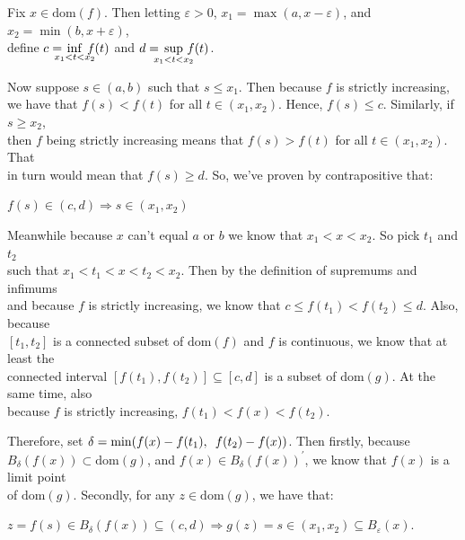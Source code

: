 \documentclass{book}
\newcommand{\pracTwo}{
   \color{Orange}%
   \fontsize{12}{14}\selectfont%
}
\newenvironment{myIndent}{%
   \begin{adjustwidth}{2.5em}{0em}%
}{%
   \end{adjustwidth}%
}
\newcommand{\myHS}{ \hspace{0.5em}}
\newcommand{\domain}[1]{\mathrm{dom}(#1)}
\newcommand{\retTwo}{\hfill\bigbreak}
\begin{document}
{\begin{myIndent} \pracTwo
   Fix $x \in \domain{f}$. Then letting $\varepsilon > 0$, $x_1 = \max(a, x-\varepsilon)$, and $x_2 = \min(b, x+\varepsilon)$,\\ define $c = \hspace{-0.9em}\inf\limits_{x_1 < t < x_2}\hspace{-0.8em}f(t)$ and $d = \hspace{-0.7em}\sup\limits_{x_1 < t < x_2}\hspace{-0.7em}f(t)$.\retTwo

   Now suppose $s \in (a, b)$ such that $s \leq x_1$. Then because $f$ is strictly increasing,\\ we have that $f(s) < f(t)$ for all $t \in (x_1, x_2)$. Hence, $f(s) \leq c$. Similarly, if $s \geq x_2$,\\ then $f$ being strictly increasing means that $f(s) > f(t)$ for all $t \in (x_1, x_2)$. That\\ in turn would mean that $f(s) \geq d$. So, we've proven by contrapositive that:

   {\centering $f(s) \in (c, d) \Longrightarrow s \in (x_1, x_2)$\retTwo\par}

   Meanwhile because $x$ can't equal $a$ or $b$ we know that $x_1 < x < x_2$. So pick $t_1$ and $t_2$\\ such that $x_1 < t_1 < x < t_2 < x_2$. Then by the definition of supremums and infimums\\ and because $f$ is strictly increasing, we know that $c \leq f(t_1) < f(t_2) \leq d$. Also, because\\ $[t_1, t_2]$ is a connected subset of $\domain{f}$ and $f$ is continuous, we know that at least the\\ connected interval $[f(t_1), f(t_2)] \subseteq [c, d]$ is a subset of $\domain{g}$. At the same time, also\\ because $f$ is strictly increasing, $f(t_1) < f(x) < f(t_2)$.\retTwo

   Therefore, set $\delta = \min(f(x) - f(t_1), \myHS f(t_2) - f(x))$. Then firstly, because\\ $B_\delta(f(x)) \subset \domain{g}$, and $f(x) \in B_\delta(f(x))^\prime$, we know that $f(x)$ is a limit point\\ of $\domain{g}$. Secondly, for any $z \in \domain{g}$, we have that:
   
   {\centering $z = f(s) \in B_\delta(f(x)) \subseteq (c, d) \Longrightarrow g(z) = s \in (x_1, x_2) \subseteq B_\varepsilon(x)$.\retTwo\par}


\end{myIndent}}
\end{document}
